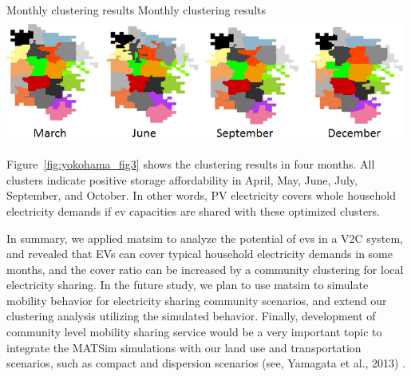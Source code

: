 {}
%
\createfigure%
{Monthly clustering results}%
{Monthly clustering results}%
{\label{fig:yokohama_fig3}}%
{\includegraphics[width=0.99\textwidth, angle=0]{./scenarios/figures/yokohama_fig3.png}}%
{}

Figure~\ref{fig:yokohama_fig3} shows the clustering results in four months. All clusters indicate positive storage affordability in April, May, June, July, September, and October. In other words, PV electricity covers whole household electricity demands if \gls{ev} capacities are shared with these optimized clusters.

In summary, we applied \gls{matsim} to analyze the potential of \glspl{ev} in a V2C system, and revealed that EVs can cover typical household electricity demands in some months, and the cover ratio can be increased by a community clustering for local electricity sharing. In the future study, we plan to use \gls{matsim} to simulate mobility behavior for electricity sharing community scenarios, and extend our clustering analysis utilizing the simulated behavior. Finally, development of community level mobility sharing service would be a very important topic to integrate the MATSim simulations with our land use and transportation scenarios, such as compact and dispersion scenarios (see, Yamagata et al., 2013) \citep[][]{}.

